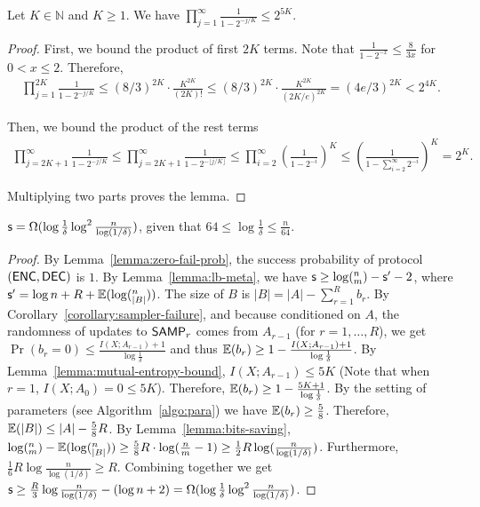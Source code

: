 \begin{lemma}\label{lemma:Pochhammer}
  Let $K\in \mathbb{N}$ and $K\ge 1$. We have $\prod_{j=1}^{\infty} \frac{1}{1-2^{-j/K}}\le 2^{5K}$.
\end{lemma}

\begin{proof}
  First, we bound the product of first $2K$ terms. Note that $\frac{1}{1-2^{-x}}\le \frac{8}{3x}$ for $0<x\le 2$. Therefore, 
  \begin{align}
    \prod_{j=1}^{2K}\frac{1}{1-2^{-j/K}}
    \le (8/3)^{2K}\cdot \frac{K^{2K}}{(2K)!}
    \le (8/3)^{2K}\cdot \frac{K^{2K}}{(2K/e)^{2K}}
    = (4e/3)^{2K}
    < 2^{4K}. 
  \end{align}
  
  Then, we bound the product of the rest terms
  \begin{align}
    \prod_{j=2K+1}^{\infty}\frac{1}{1-2^{-j/K}} 
    \le \prod_{j=2K+1}^{\infty}\frac{1}{1-2^{-\lfloor j/K \rfloor}} 
    \le \prod_{i=2}^{\infty}\left( \frac{1}{1-2^{-i}}\right)^K 
    \le \left( \frac{1}{1-\sum_{i=2}^{\infty}2^{-i}}\right)^K
    = 2^K.
  \end{align}
  
  Multiplying two parts proves the lemma.
\end{proof}

\begin{theorem}
  $\textsf{s} = \Omega(\log \frac{1}{\delta}\log^2 \frac{n}{\log (1/\delta)} )$, given that $64 \le \log \frac{1}{\delta} \le \frac{n}{64}$.
\end{theorem}

\begin{proof}
  By Lemma~\ref{lemma:zero-fail-prob}, the success probability of protocol $(\textsf{ENC},\textsf{DEC})$ is $1$. 
  By Lemma~\ref{lemma:lb-meta}, we have $\textsf{s}\ge \log (^n_m) - \textsf{s}' -2$, where $\textsf{s}'=\log n + R+ \operatorname*{\mathbb{E}}(\log (^n_{|B|}))$. 
  The size of $B$ is $|B|=|A|-\sum_{r=1}^{R}{b_r}$.
  By Corollary~\ref{corollary:sampler-failure}, and because conditioned on $A$, the randomness of updates to $\textsf{SAMP}_r$ comes from $A_{r-1}$ (for $r=1, \ldots, R$), we get $\Pr(b_r=0)\le \frac{I(X;A_{r-1})+1}{\log\frac{1}{\delta}}$ and thus $\operatorname*{\mathbb{E}}(b_r)\ge 1-\frac{I(X;A_{r-1})+1}{\log\frac{1}{\delta}}$. 
  By Lemma~\ref{lemma:mutual-entropy-bound}, $I(X;A_{r-1})\le 5K$ (Note that when $r=1$, $I(X;A_0)=0\le 5K$). Therefore, $\operatorname*{\mathbb{E}}(b_r)\ge 1-\frac{5K+1}{\log\frac{1}{\delta}}$.
  By the setting of parameters (see Algorithm~\ref{algo:para}) we have $\operatorname*{\mathbb{E}}(b_r)\ge \frac{5}{8}$. Therefore, $\operatorname*{\mathbb{E}}(|B|)\le |A|-\frac{5}{8}R$. 
  By Lemma~\ref{lemma:bits-saving}, $\log (^n_m)-\operatorname*{\mathbb{E}}(\log (^n_{|B|}))\ge \frac{5}{8}R\cdot \log (\frac{n}{m}-1) \ge \frac{1}{2}R\log (\frac{n}{\log(1/\delta)})$. 
  Furthermore, $\frac{1}{6}R\log \frac{n}{\log (1/\delta)} \ge R$.
  Combining together we get $\textsf{s} \ge \frac{R}{3}\log \frac{n}{\log(1/\delta)} -(\log n + 2)  =\Omega(\log \frac{1}{\delta}\log^2 \frac{n}{\log (1/\delta)} )$.
\end{proof}
